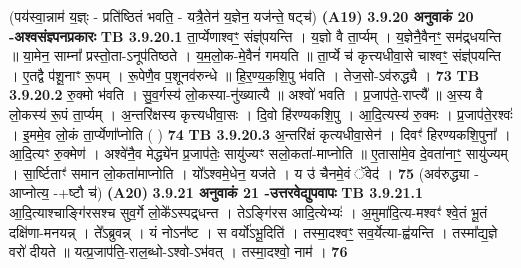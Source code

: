 \documentclass[17pt]{extarticle}
\begin{document}
{{{{{{{{{{{{{{{{{{{{{{                                (पय॑स्वा॒न्नाम॑ य॒ज्ञ्ः - प्रति॑ष्ठितं भवति॒ - यत्रै॒तेन॑ य॒ज्ञेन॒ यज॑न्ते॒ षट्च॑) \textbf{(A19)} \newline \newline
                \textbf{ 3.9.20    अनुवाकं   20 -अश्वसंज्ञ्पनप्रकारः} \newline
                                \textbf{ TB 3.9.20.1} \newline
                  ता॒र्प्येणाश्वꣳ॒॒ संज्ञ्॑पयन्ति । य॒ज्ञो वै ता॒र्प्यम् । य॒ज्ञेनै॒वैनꣳ॒॒ सम॑द्र्धयन्ति ॥ या॒मेन॒ साम्ना᳚ प्रस्तो॒ता-ऽनूप॑तिष्ठते । य॒म॒लो॒क-मे॒वैनं॑ गमयति ॥ ता॒र्प्ये च॑ कृत्त्यधीवा॒से चाश्वꣳ॒॒ संज्ञ्॑पयन्ति । ए॒तद्वै प॑शू॒नाꣳ रू॒पम् । रू॒पेणै॒व प॒शूनव॑रुन्धे ॥ हि॒र॒ण्य॒क॒शि॒पु भ॑वति । तेज॒सो-ऽव॑रुद्ध्यै । \textbf{ 73} \newline
                  \newline
                                \textbf{ TB 3.9.20.2} \newline
                  रु॒क्मो भ॑वति । सु॒व॒र्गस्य॑ लो॒कस्या-नु॑ख्यात्यै ॥ अश्वो॑ भवति । प्र॒जाप॑ते॒-राप्त्यै᳚ ॥ अ॒स्य वै लो॒कस्य॑ रू॒पं ता॒र्प्यम् । अ॒न्तरि॑क्षस्य कृत्त्यधीवा॒सः । दि॒वो हि॑रण्यकशि॒पु । आ॒दि॒त्यस्य॑ रु॒क्मः । प्र॒जाप॑ते॒रश्वः॑ । इ॒ममे॒व लो॒कं ता॒र्प्येणा᳚प्नोति ( ) \textbf{ 74} \newline
                  \newline
                                \textbf{ TB 3.9.20.3} \newline
                  अ॒न्तरि॑क्षं कृत्यधीवा॒सेन॑ । दिवꣳ॑ हिरण्यकशि॒पुना᳚ । आ॒दि॒त्यꣳ रु॒क्मेण॑ । अश्वे॑नै॒व मेद्ध्ये॑न प्र॒जाप॑तेः॒ सायु॑ज्यꣳ सलो॒कता॑-माप्नोति ॥ ए॒तासा॑मे॒व दे॒वता॑नाꣳ॒॒ सायु॑ज्यम् । सा॒र्ष्टिताꣳ॑ समान लो॒कता॑माप्नोति । यो᳚ऽश्वमे॒धेन॒ यज॑ते । य उ॑ चैनमे॒वं ॅवेद॑ । \textbf{ 75} \newline
                  \newline
                                    (अव॑रुद्ध्या - आप्नोत्य॒ -+ष्टौ च॑) \textbf{(A20)} \newline \newline
                \textbf{ 3.9.21    अनुवाकं   21 -उत्तरवेद्युपवापः} \newline
                                \textbf{ TB 3.9.21.1} \newline
                  आ॒दि॒त्याश्चाङ्गि॑रसश्च सुव॒र्गे लो॒के᳚ऽस्पद्र्धन्त । तेऽङ्गि॑रस आदि॒त्येभ्यः॑ । अ॒मुमा॑दि॒त्य-मश्वꣳ॑ श्वे॒तं भू॒तं दक्षि॑णा-मनयन्न् । ते᳚ऽब्रुवन्न् । यं नोऽन᳚ष्ट । स वर्यो॑ऽभू॒दिति॑ । तस्मा॒दश्वꣳ॒॒ सव॒र्येत्या-ह्व॑यन्ति । तस्मा᳚द्य॒ज्ञे वरो॑ दीयते ॥ यत्प्र॒जाप॑ति॒-राल॒ब्धो-ऽश्वो-ऽभ॑वत् । तस्मा॒दश्वो॒ नाम॑ । \textbf{ 76} \newline
}}}}}}}}}}}}}}}}}}}}}}
\end{document}

